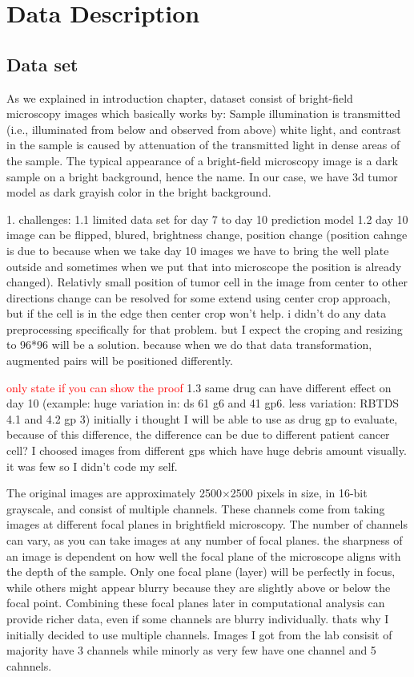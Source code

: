 \chapter{Data Description}\label{ch: Data Description}
\section{Data set}
\label{sec:Data set}

As we explained in introduction chapter, dataset consist of bright-field microscopy images which 
basically works by: 
Sample illumination is transmitted (i.e., illuminated from below and observed from above) 
white light, and contrast
in the sample is caused by attenuation of the transmitted light in dense areas of the sample. The
 typical appearance 
of a bright-field microscopy image is a dark sample on a bright background, hence the name.
In our case, we have   3d tumor model as dark grayish color in the bright background.

1. challenges:
1.1 limited data set for day 7 to day 10 prediction model
1.2 day 10  image can be flipped, blured, brightness change, position change (position cahnge is due to because when we take day 10 images we have to bring the
 well plate outside and sometimes
 when we put that into microscope the position is already changed). Relativly small position of tumor cell in the image from center to other directions change  can 
be resolved for some extend using center crop approach, but if the cell is in the edge then center crop won't help. i didn't do any data
 preprocessing
 specifically for that problem. but I expect the croping and resizing to 96*96 will be a solution. because 
 when we do that 
 data transformation, augmented pairs will be positioned differently. 
 
 \textcolor{red}{only state if you can show the proof}
1.3 same drug can have different effect on day 10 (example: huge variation in: ds 61 g6 and 41 gp6. less variation: 
RBTDS 4.1 and 4.2 gp 3) initially i thought I will be able to use 
as drug gp to evaluate, because of this difference, the difference can be due to different patient cancer cell?
I choosed images from different gps which have huge debris amount visually. it was few so I didn't code my self.

The original images are approximately 2500×2500 pixels in size, in 16-bit grayscale,
 and consist of multiple channels. These channels come from taking images at different 
 focal planes in brightfield microscopy. The number of channels can vary, as you can take
  images at any number of focal planes. the sharpness of an image is dependent 
  on how well the focal plane of the microscope aligns with the depth of the sample. Only one focal plane
   (layer) will be perfectly in focus, while others might appear blurry because they are slightly above 
   or below the focal point. Combining these focal planes later in computational analysis can provide richer data,
    even if some channels are blurry individually. thats why I initially decided to use multiple channels.
  Images I got from the lab consisit of majority have 3 channels while minorly as very few have one channel and 
  5 cahnnels.

